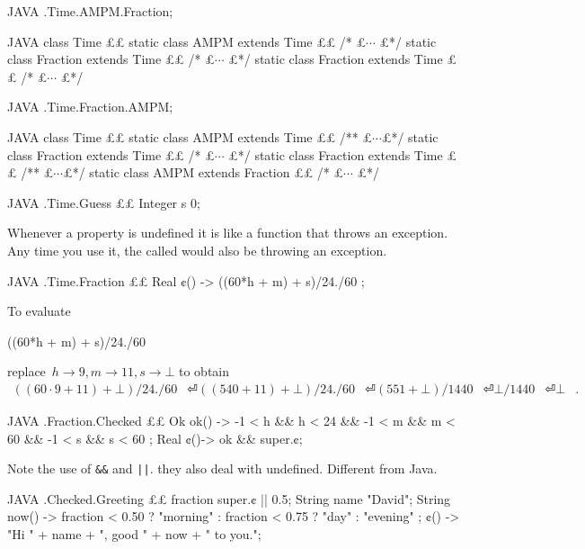 \begin{code}{JAVA}
.Time.AMPM.Fraction;
\end{code}

\begin{code}{JAVA}
class Time {££
  static class AMPM extends Time {££
      /* £$⋯$ £*/
    static class Fraction extends Time {££ /* £$⋯$ £*/}
  }
  static class Fraction extends Time {££ /* £$⋯$ £*/}
}
\end{code}

\begin{code}{JAVA}
.Time.Fraction.AMPM;
\end{code}

\begin{code}{JAVA}
class Time {££
  static class AMPM extends Time {££
    /** £$⋯$£*/
    static class Fraction extends Time {££ /* £$⋯$ £*/}
  }
  static class Fraction extends Time {££
    /** £$⋯$£*/
    static class AMPM extends Fraction {££ /* £$⋯$ £*/}
  }
}
\end{code}

\begin{code}{JAVA}
.Time.Guess {££
  Integer s 0;
}
\end{code}

Whenever a property is undefined it is like a function that throws an exception.
Any time you use it, the called would also be throwing an exception.
\begin{code}{JAVA}
.Time.Fraction {££
  Real ¢() -> ((60*h + m) + s)/24./60 ;
}
\end{code}
To evaluate
\begin{java}
  ((60*h + m) + s)/24./60
\end{java}
replace~$h→9, m→11, s→⊥$
to obtain 
\begin{align}
  ((60·9 + 11) + ⊥)/24./60 & ⏎
  ((540 + 11) + ⊥)/24./60 & ⏎
  (551 + ⊥)/1440 & ⏎
  ⊥/1440 &⏎
  ⊥ &.
\end{align}

\begin{code}{JAVA}
.Fraction.Checked {££
 Ok ok() ->
   -1 < h && h < 24 &&
   -1 < m && m < 60 &&
   -1 < s && s < 60 ;
 Real ¢()-> ok && super.¢;
}
\end{code}

Note the use of \verb+&&+ and \verb+||+. they also deal with undefined.
Different from Java.
\begin{code}{JAVA}
.Checked.Greeting {££
  fraction     super.¢ || 0.5;
  String name  "David";
  String now() ->
      fraction < 0.50 ? "morning" :
      fraction < 0.75 ? "day" :
      "evening"
  ;
  ¢() -> "Hi " + name + ", good " + now + " to you.";
}
\end{code}

